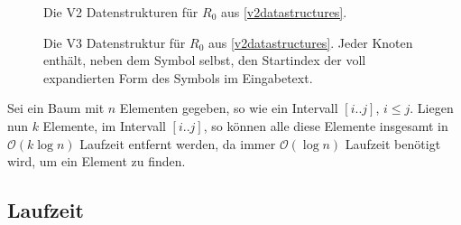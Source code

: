 \begin{figure}
    \centering
    \begin{minipage}{0.3\textwidth}
        \centering
        
        \caption{Die V2 Datenstrukturen für $R_0$ aus \autoref{v2datastructures}.}
        \label{v2ruledatastructure}
    \end{minipage}
    \quad
    \begin{minipage}{0.60\textwidth}
        \centering
        \caption{Die V3 Datenstruktur für $R_0$ aus \autoref{v2datastructures}. Jeder Knoten enthält, neben dem Symbol selbst, den Startindex der voll expandierten Form des Symbols im Eingabetext.}
        \label{v3ruledatastructure}
    \end{minipage}
    

\end{figure}

Sei ein Baum mit $n$ Elementen gegeben, so wie ein Intervall $[i..j]$, $i \leq j$. Liegen nun $k$ Elemente, im Intervall $[i..j]$, so können alle diese Elemente insgesamt in $\mathcal{O}(k \log n)$ Laufzeit entfernt werden, da immer $\mathcal{O}(\log n)$ Laufzeit benötigt wird, um ein Element zu finden.

\subsection{Laufzeit}


